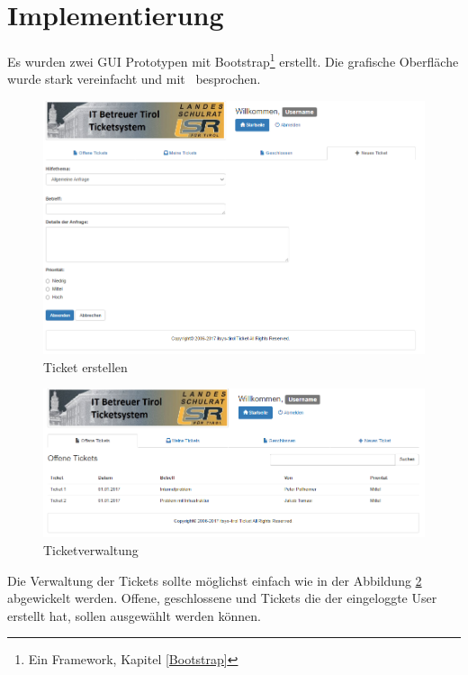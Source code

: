 	\newpage
	\section{Implementierung}
	Es wurden zwei GUI Prototypen mit Bootstrap\footnote{Ein Framework,  Kapitel \ref{Bootstrap}}  erstellt. Die grafische Oberfläche wurde stark vereinfacht und mit \getHammerl\ besprochen.
	\begin{figure}[h]
		\centering
		\includegraphics[scale=0.6]{figures/newTicket.png}
		\caption{Ticket erstellen}
		\label{Ein Ticket erstellen}
	\end{figure}
	\newpage
	\begin{figure}[h]
		\centering
		\includegraphics[scale=0.68]{figures/index.png}
		\caption{Ticketverwaltung}
		\label{Tickets verwalten}
	\end{figure}
Die Verwaltung der Tickets sollte möglichst einfach wie in der Abbildung \ref{Tickets verwalten} abgewickelt werden. Offene, geschlossene und Tickets die der eingeloggte User erstellt hat, sollen ausgewählt werden können.
